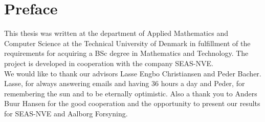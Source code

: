 \chapter{Preface}
This thesis was written at the department of Applied Mathematics and Computer Science at the Technical University of Denmark in fulfillment of the requirements for acquiring a BSc degree in Mathematics and Technology. The project is developed in cooperation with the company SEAS-NVE. \\

\noindent We would like to thank our advisors Lasse Engbo Christiansen and Peder Bacher. Lasse, for always answering emails and having 36 hours a day and Peder, for remembering the sun and to be eternally optimistic. Also a thank you to Anders Buur Hansen for the good cooperation and the opportunity to present our results for SEAS-NVE and Aalborg Forsyning. 

\vfill

{
\begin{flushright}
    \thesisauthor{}
\end{flushright}
}